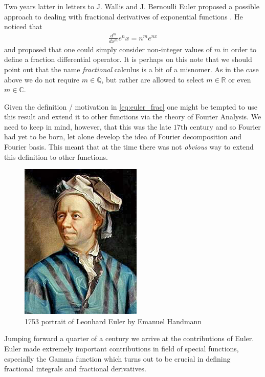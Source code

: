 Two years latter in letters to J. Wallis and J. Bernoulli Euler proposed a possible approach to dealing with fractional derivatives of exponential functions \cite{Abbas2012}. He noticed that
\begin{align}
    \label{eq:euler_frac}
    \frac{d^m}{dx^m} e^nx = n^me^{nx} 
\end{align}
and proposed that one could simply consider non-integer values of $ m $ in order to define a fraction differential operator. 
It is perhaps on this note that we should point out that the name \emph{fractional} calculus is a bit of a misnomer. As in the case above we do not require $ m \in \mathbb{Q} $, but rather are allowed to select $ m \in \mathbb{R} $ or even $ m \in \mathbb{C} $.

Given the definition / motivation in \eqref{eq:euler_frac} one might be tempted to use this result and extend it to other functions via the theory of Fourier Analysis. We need to keep in mind, however, that this was the late $ 17$th century and so Fourier had yet to be born, let alone develop the idea of Fourier decomposition and Fourier basis. This meant that at the time there was not \emph{obvious} way to extend this definition to other functions.

\begin{figure}
    \includegraphics[scale=0.8]{images/Leonhard_Euler}
    \caption{1753 portrait of Leonhard Euler by Emanuel Handmann}
\end{figure}

Jumping forward a quarter of a century we arrive at the contributions of Euler. Euler made extremely important contributions in field of special functions, especially the Gamma function which turns out to be crucial in defining fractional integrals and fractional derivatives.

